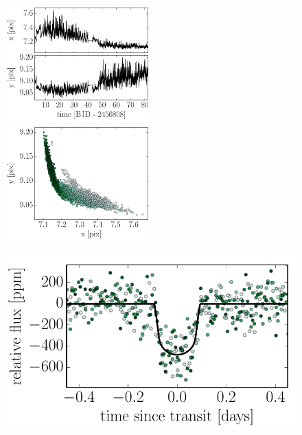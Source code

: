 \documentclass[12pt,preprint]{aastex}
\newcommand{\figlabel}[1]{\label{fig:#1}}
\begin{document}
\begin{figure}[p]
\begin{center}
\includegraphics[width=0.5\textwidth]{figures/centroid.pdf}
\includegraphics[width=0.5\textwidth]{figures/centroid-2.pdf}
\end{center}
\caption{%
\figlabel{centroid}}
\end{figure}

\begin{figure}[p]
\begin{center}
\includegraphics{figures/folded.pdf}
\end{center}
\caption{%
\figlabel{folded}}
\end{figure}
\end{document}
